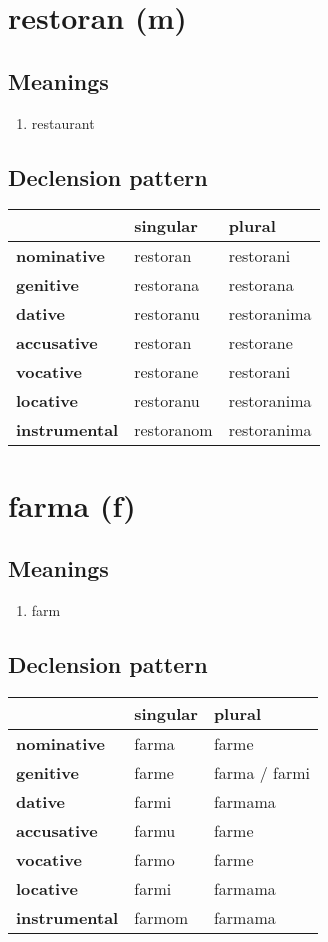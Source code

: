 \filbreak
\section{restoran (m)}
\subsection*{Meanings}
\begin{enumerate}
\item restaurant
\end{enumerate}
\subsection*{Declension pattern}
\begin{tabularx}{\linewidth}{Xll}
\toprule
{} &    singular &       plural \\
\midrule
\textbf{nominative  } &    restoran &    restorani \\
\textbf{genitive    } &   restorana &    restorana \\
\textbf{dative      } &   restoranu &  restoranima \\
\textbf{accusative  } &    restoran &    restorane \\
\textbf{vocative    } &   restorane &    restorani \\
\textbf{locative    } &   restoranu &  restoranima \\
\textbf{instrumental} &  restoranom &  restoranima \\
\bottomrule
\end{tabularx}

\filbreak
\section{farma (f)}
\subsection*{Meanings}
\begin{enumerate}
\item farm
\end{enumerate}
\subsection*{Declension pattern}
\begin{tabularx}{\linewidth}{Xll}
\toprule
{} & singular &         plural \\
\midrule
\textbf{nominative  } &    farma &          farme \\
\textbf{genitive    } &    farme &  farma / farmi \\
\textbf{dative      } &    farmi &        farmama \\
\textbf{accusative  } &    farmu &          farme \\
\textbf{vocative    } &    farmo &          farme \\
\textbf{locative    } &    farmi &        farmama \\
\textbf{instrumental} &   farmom &        farmama \\
\bottomrule
\end{tabularx}

